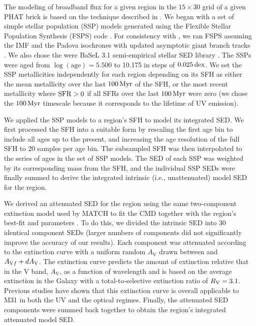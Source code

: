 The modeling of broadband flux for a given region in the $15 \times 30$ grid of
a given PHAT brick is based on the technique described in \citet{Johnson:2013}.
We began with a set of simple stellar population (SSP) models generated using
the Flexible Stellar Population Synthesis (FSPS) code \citep{Conroy:2009,
Conroy:2010}. For consistency with \citet{Lewis:2014}, we ran FSPS assuming the
\citet{Kroupa:2001} IMF and the Padova isochrones \citep{Marigo:2008} with
updated asymptotic giant branch tracks \citep{Girardi:2010}. We also chose the
were BaSeL 3.1 semi-empirical stellar SED library \citep{Westera:2002}. The
SSPs were aged from $\log(\mathrm{age})=5.500$ to 10.175 in steps of
$0.025\,\mathrm{dex}$. We set the SSP metallicities independently for each region
depending on its SFH as either the mean metallicity over the last $100\,\mathrm{Myr}$ of
the SFH, or the most recent metallicity where $\mathrm{SFR} > 0$ if all SFRs over the
last $100\,\mathrm{Myr}$ were zero (we chose the $100\,\mathrm{Myr}$ timescale because it
corresponds to the lifetime of UV emission).

We applied the SSP models to a region's SFH to model its integrated SED. We
first processed the SFH into a suitable form by rescaling the first age bin to
include all ages up to the present, and increasing the age resolution of the
full SFH to 20 samples per age bin. The subsampled SFH was then interpolated to
the series of ages in the set of SSP models. The SED of each SSP was weighted
by its corresponding mass from the SFH, and the individual SSP SEDs were
finally summed to derive the integrated intrinsic (i.e., unattenuated) model
SED for the region.

We derived an attenuated SED for the region using the same two-component
extinction model used by MATCH to fit the CMD together with the region's
best-fit \avf{} and \dav{} parameters \citep{Lewis:2014}. To do this, we
divided the intrinsic SED into 30 identical component SEDs (larger numbers of
components did not significantly improve the accuracy of our results). Each
component was attenuated according to the \citet{Cardelli:1989} extinction
curve with a uniform random $A_\mathrm{V}$ drawn between \avf{} and $A_{\mathrm{V}f} +
dA_\mathrm{V}$. The \citet{Cardelli:1989} extinction curve predicts the amount of
extinction relative that in the V band, $A_\mathrm{V}$, as a function of
wavelength and is based on the average extinction in the Galaxy with a
total-to-selective extinction ratio of $R_\mathrm{V} = 3.1$. Previous studies have shown
that this extinction curve is overall applicable to M31 in both the UV
\citep{Bianchi:1996} and the optical \citet{Barmby:2000} regimes. Finally, the
attenuated SED components were summed back together to obtain the region's
integrated attenuated model SED.

